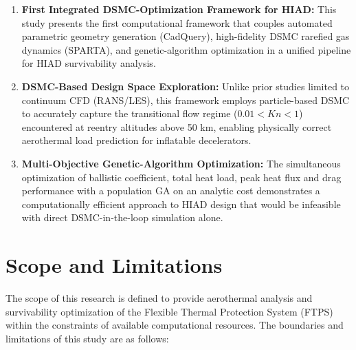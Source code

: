 \begin{enumerate}
    \item \textbf{First Integrated DSMC-Optimization Framework for HIAD:} This study presents the first computational framework that couples automated parametric geometry generation (CadQuery), high-fidelity DSMC rarefied gas dynamics (SPARTA), and genetic-algorithm optimization in a unified pipeline for HIAD survivability analysis.

    \item \textbf{DSMC-Based Design Space Exploration:} Unlike prior studies limited to continuum CFD (RANS/LES), this framework employs particle-based DSMC to accurately capture the transitional flow regime ($0.01 < Kn < 1$) encountered at reentry altitudes above 50 km, enabling physically correct aerothermal load prediction for inflatable decelerators.


    \item \textbf{Multi-Objective Genetic-Algorithm Optimization:} The simultaneous optimization of ballistic coefficient, total heat load, peak heat flux and drag performance with a population GA on an analytic cost demonstrates a computationally efficient approach to HIAD design that would be infeasible with direct DSMC-in-the-loop simulation alone.
\end{enumerate}

\section{Scope and Limitations}

The scope of this research is defined to provide aerothermal analysis and survivability optimization of the Flexible Thermal Protection System (FTPS) within the constraints of available computational resources. The boundaries and limitations of this study are as follows:

